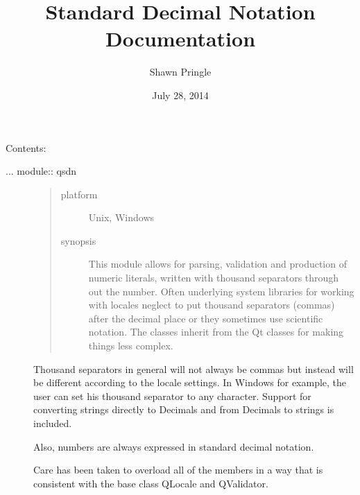 \documentclass[letterpaper,10pt,english]{sphinxmanual}
\title{Standard Decimal Notation Documentation}
\date{July 28, 2014}
\author{Shawn Pringle}
\begin{document}
\maketitle
\tableofcontents
{}\label{index::doc}


Contents:
\label{index:module-qsdn}\begin{description}
\item[{... module:: qsdn}] \leavevmode\begin{quote}\begin{description}
\item[{platform}] \leavevmode
Unix, Windows

\item[{synopsis}] \leavevmode
This module allows for parsing, validation and production of numeric literals, written with thousand separators through out the number.  Often underlying system libraries for working with locales neglect to put thousand separators (commas) after the decimal place or they sometimes use scientific notation.  The classes inherit from the Qt classes for making things less complex.

\end{description}\end{quote}

Thousand separators in general will not always be commas but instead will be different according to the locale settings.  In Windows for example, the user can set his thousand separator to any character.  Support for converting strings directly to Decimals and from Decimals to strings is included.

Also, numbers are always expressed in standard decimal notation.

Care has been taken to overload all of the members in a way
that is consistent with the base class QLocale and QValidator.

\end{description}
\end{document}
